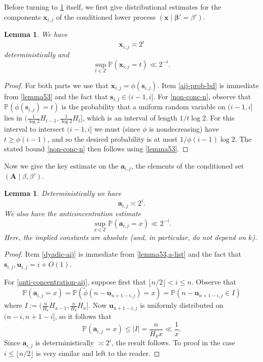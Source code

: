 \documentclass[11pt,reqno]{amsart}
\numberwithin{equation}{section}
\newtheorem{lemma}[theorem]{Lemma}
\theoremstyle{definition}
\theoremstyle{remark}
\newcommand{\mb}{\mathbb}
\newcommand{\mbf}{\mathbf}
\def\boldbeta{\boldsymbol\beta}
\renewcommand{\le}{\leqslant}
\renewcommand{\ge}{\geqslant}
\newcommand\Z{\mathbb{Z}}
\begin{document}
Before turning to \cref{aij-dist} itself, we first give distributional estimates for the components $\mbf{x}_{i,j}$ of the conditioned lower process $(\mbf{x} \mid \boldbeta' = \beta')$.

\begin{lemma} We have
\begin{equation} \label{aij-prob-bd} \mbf{x}_{i,j} \asymp 2^i \end{equation} deterministically and
\begin{equation}\label{non-conc-n} \sup_{t\in \Z} \mb{P}(\mbf{x}_{i,j} = t) \ll 2^{-i}.\end{equation}

\end{lemma}
\begin{proof}
For both parts we use that $\mbf{x}_{i,j} = \phi(\mbf{s}_{i,j})$. Item \cref{aij-prob-bd} is immediate from \cref{lemma53} and the fact that $\mbf{s}_{i,j} \in (i-1,i]$. For \cref{non-conc-n}, observe that $\mb{P}(\phi(\mbf{s}_{i,j}) = t)$ is the probability that a uniform random variable on $(i-1, i]$ lies in $(\frac{1}{\log 2} H_{t-1}, \frac{1}{\log 2} H_t]$, which is an interval of length $1/t\log 2$. For this interval to intersect $(i-1, i]$ we must (since $\phi$ is nondecreasing) have $t \ge \phi(i-1)$, and so the desired probability is at most $1/\phi(i-1) \log 2$. The stated bound \cref{non-conc-n} then follows using \cref{lemma53}.
\end{proof}

Now we give the key estimate on the $\mbf{a}_{i,j}$, the elements of the conditioned set $(\mbf{A} \mid \beta,\beta')$.

\begin{lemma}\label{aij-dist}
Deterministically we have
\begin{equation}\label{dyadic-aij}  \mbf{a}_{i,j} \asymp 2^{i}.\end{equation}
We also have the anticoncentration estimate
\begin{equation}\label{anti-concentration-aij} \sup_{x \in \Z}\mb{P}(\mbf{a}_{i,j} = x) \ll 2^{-i}.\end{equation}  
Here, the implied constants are absolute \textup{(}and, in particular, do not depend on $k$\textup{)}.
\end{lemma}
\begin{proof} 
Item \cref{dyadic-aij} is immediate from \cref{lemma53,a-list} and the fact that $\mbf{s}_{i,j}, \mbf{u}_{i,j} = i + O(1)$.

For \cref{anti-concentration-aij}, suppose first that $\lfloor n/2\rfloor < i \le n$. Observe that 
\[ \mb{P}(\mbf{a}_{i,j} = x) = \mb{P}(\tilde\phi(n - \mbf{u}_{n + 1 - i,j}) = x) = \mb{P} ( n - \mbf{u}_{n + 1 - i,j} \in I )\] where $I := (\frac{n}{H_k} H_{x - 1}, \frac{n}{H_k} H_x ]$. Now $\mbf{u}_{n + 1 - i,j}$ is uniformly distributed on $(n -i , n + 1 - i]$, so it follows that 
\[ \mb{P}(\mbf{a}_{i,j} = x) \le |I| = \frac{n}{H_k x} \ll \frac{1}{x}.\]
Since $\mbf{a}_{i,j}$ is deterministically $\asymp 2^{i}$, the result follows.
To proof in the case $i \le \lfloor n/2\rfloor$ is very similar and left to the reader.
\end{proof}
\end{document}

